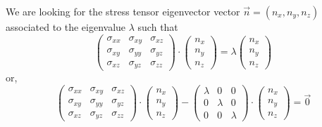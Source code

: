 We are looking for the stress tensor eigenvector vector $\vec{n}=(n_x,n_y,n_z)$ associated to the
eigenvalue $\lambda$ such that 
\[
\left(
\begin{array}{ccc}
\sigma_{xx} & \sigma_{xy} & \sigma_{xz} \\
\sigma_{xy} & \sigma_{yy} & \sigma_{yz} \\
\sigma_{xz} & \sigma_{yz} & \sigma_{zz}
\end{array}
\right)
\cdot
\left(
\begin{array}{c}
n_x \\ n_y \\ n_z
\end{array}
\right)
=
\lambda
\left(
\begin{array}{c}
n_x \\ n_y \\ n_z
\end{array}
\right)
\]
or,
\[
\left(
\begin{array}{ccc}
\sigma_{xx} & \sigma_{xy} & \sigma_{xz} \\
\sigma_{xy} & \sigma_{yy} & \sigma_{yz} \\
\sigma_{xz} & \sigma_{yz} & \sigma_{zz}
\end{array}
\right)
\cdot
\left(
\begin{array}{c}
n_x \\ n_y \\ n_z
\end{array}
\right)
-
\left(
\begin{array}{ccc}
\lambda & 0 & 0\\ 
0 & \lambda  & 0 \\
0 & 0 & \lambda 
\end{array}
\right)
\cdot
\left(
\begin{array}{c}
n_x \\ n_y \\ n_z
\end{array}
\right)
= \vec{0}
\]


